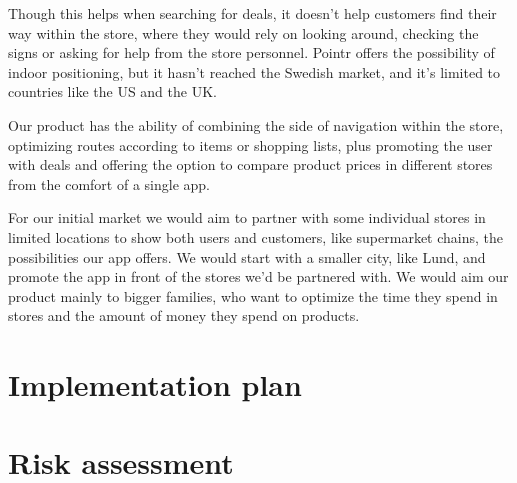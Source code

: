 \documentclass[titlepage]{article}
\begin{document}
Though this helps when searching for deals, it doesn’t help customers find their way within the store, where they would rely on looking around, checking the signs or asking for help from the store personnel. Pointr offers the possibility of indoor positioning, but it hasn’t reached the Swedish market, and it’s limited to countries like the US and the UK. 

Our product has the ability of combining the side of navigation within the store, optimizing routes according to items or shopping lists, plus promoting the user with deals and offering the option to compare product prices in different stores from the comfort of a single app.

For our initial market we would aim to partner with some individual stores in limited locations to show both users and customers, like supermarket chains, the possibilities our app offers. We would start with a smaller city, like Lund, and promote the app in front of the stores we’d be partnered with. We would aim our product mainly to bigger families, who want to optimize the time they spend in stores and the amount of money they spend on products.

\section{Implementation plan}

\section{Risk assessment}
\end{document}
